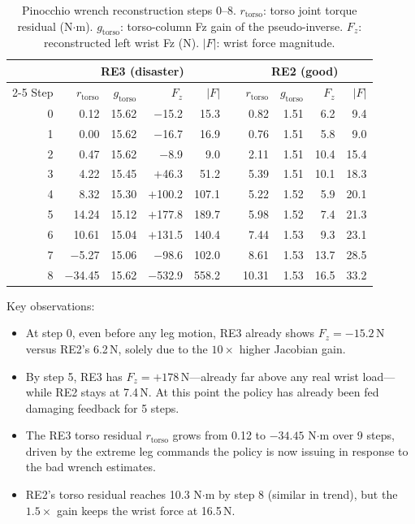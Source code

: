 \documentclass[11pt,a4paper]{article}
\newcommand{\re}[1]{\textcolor{red3}{\textbf{#1}}}
\newcommand{\good}[1]{\textcolor{blue2}{\textbf{#1}}}
\begin{document}
\begin{table}[H]
\centering
\caption{Pinocchio wrench reconstruction steps 0--8.
         $r_\text{torso}$: torso joint torque residual (N$\cdot$m).
         $g_\text{torso}$: torso-column Fz gain of the pseudo-inverse.
         $F_z$: reconstructed left wrist Fz (N).  $|F|$: wrist force magnitude.}
\label{tab:pin_trace}
\begin{tabular}{rrrrrrrrrr}
\toprule
 &
\multicolumn{4}{c}{\re{RE3 (disaster)}} &&
\multicolumn{4}{c}{\good{RE2 (good)}} \\
\cmidrule{2-5}\cmidrule{7-10}
Step & $r_\text{torso}$ & $g_\text{torso}$ & $F_z$ & $|F|$ &&
       $r_\text{torso}$ & $g_\text{torso}$ & $F_z$ & $|F|$ \\
\midrule
0 & 0.12 & 15.62 & $-$15.2 & 15.3 && 0.82 & 1.51 & 6.2 & 9.4 \\
1 & 0.00 & 15.62 & $-$16.7 & 16.9 && 0.76 & 1.51 & 5.8 & 9.0 \\
2 & 0.47 & 15.62 & $-$8.9  & 9.0  && 2.11 & 1.51 & 10.4 & 15.4 \\
3 & 4.22 & 15.45 & $+$46.3 & 51.2 && 5.39 & 1.51 & 10.1 & 18.3 \\
4 & 8.32 & 15.30 & $+$100.2& 107.1&& 5.22 & 1.52 & 5.9 & 20.1 \\
5 & 14.24& 15.12 & $+$177.8& 189.7&& 5.98 & 1.52 & 7.4 & 21.3 \\
6 & 10.61& 15.04 & $+$131.5& 140.4&& 7.44 & 1.53 & 9.3 & 23.1 \\
7 & $-$5.27 & 15.06 & $-$98.6 & 102.0&& 8.61 & 1.53 & 13.7 & 28.5 \\
8 & $-$34.45& 15.62 &$-$532.9& 558.2&& 10.31& 1.53 & 16.5 & 33.2 \\
\bottomrule
\end{tabular}
\end{table}

\noindent Key observations:
\begin{itemize}
\item At step 0, even before any leg motion, RE3 already shows $F_z = -15.2$\,N
      versus RE2's 6.2\,N, solely due to the $10\times$ higher Jacobian gain.
\item By step 5, RE3 has $F_z = +178$\,N---already far above any real
      wrist load---while RE2 stays at 7.4\,N.  At this point the policy
      has already been fed damaging feedback for 5 steps.
\item The RE3 torso residual $r_\text{torso}$ grows from 0.12 to $-34.45$
      N$\cdot$m over 9 steps, driven by the extreme leg commands the policy
      is now issuing in response to the bad wrench estimates.
\item RE2's torso residual reaches 10.3 N$\cdot$m by step 8 (similar in
      trend), but the $1.5\times$ gain keeps the wrist force at 16.5\,N.
\end{itemize}
\end{document}
